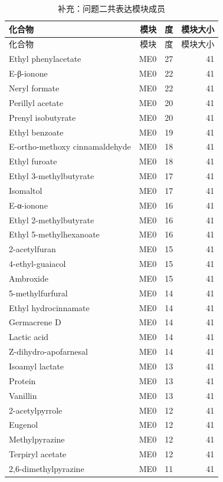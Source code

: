 {\footnotesize
\setlength{\tabcolsep}{3.5pt}
\begin{longtable}{lrrr}
\caption{补充：问题二共表达模块成员}
\label{tab:s03_q2_members}\\
\toprule
化合物 & 模块 & 度 & 模块大小 \\
\midrule
\endfirsthead
\toprule
化合物 & 模块 & 度 & 模块大小 \\
\midrule
\endhead
\bottomrule
\endlastfoot
Ethyl phenylacetate & ME0 & 27 & 41 \\
E-β-ionone & ME0 & 22 & 41 \\
Neryl formate & ME0 & 22 & 41 \\
Perillyl acetate & ME0 & 20 & 41 \\
Prenyl isobutyrate & ME0 & 20 & 41 \\
Ethyl benzoate & ME0 & 19 & 41 \\
E-ortho-methoxy cinnamaldehyde & ME0 & 18 & 41 \\
Ethyl furoate & ME0 & 18 & 41 \\
Ethyl 3-methylbutyrate & ME0 & 17 & 41 \\
Isomaltol & ME0 & 17 & 41 \\
E-α-ionone & ME0 & 16 & 41 \\
Ethyl 2-methylbutyrate & ME0 & 16 & 41 \\
Ethyl 5-methylhexanoate & ME0 & 16 & 41 \\
2-acetylfuran & ME0 & 15 & 41 \\
4-ethyl-guaiacol & ME0 & 15 & 41 \\
Ambroxide & ME0 & 15 & 41 \\
5-methylfurfural & ME0 & 14 & 41 \\
Ethyl hydrocinnamate & ME0 & 14 & 41 \\
Germacrene D & ME0 & 14 & 41 \\
Lactic acid & ME0 & 14 & 41 \\
Z-dihydro-apofarnesal & ME0 & 14 & 41 \\
Isoamyl lactate & ME0 & 13 & 41 \\
Protein & ME0 & 13 & 41 \\
Vanillin & ME0 & 13 & 41 \\
2-acetylpyrrole & ME0 & 12 & 41 \\
Eugenol & ME0 & 12 & 41 \\
Methylpyrazine & ME0 & 12 & 41 \\
Terpiryl acetate & ME0 & 12 & 41 \\
2,6-dimethylpyrazine & ME0 & 11 & 41 \\

\end{longtable}}
